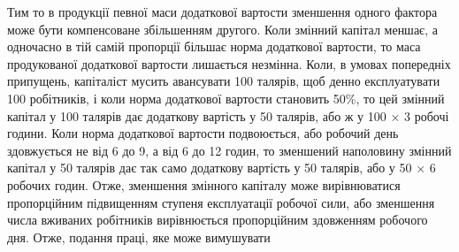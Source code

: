 Тим то в продукції певної маси додаткової вартости зменшення
одного фактора може бути компенсоване збільшенням другого.
Коли змінний капітал меншає, а одночасно в тій самій пропорції
більшає норма додаткової вартости, то маса продукованої додаткової
вартости лишається незмінна. Коли, в умовах попередніх
припущень, капіталіст мусить авансувати 100 талярів, щоб денно
експлуатувати 100 робітників, і коли норма додаткової вартости
становить 50\%, то цей змінний капітал у 100 талярів дає додаткову
вартість у 50 талярів, або ж у 100 × 3 робочі години. Коли
норма додаткової вартости подвоюється, або робочий день здовжується
не від 6 до 9, а від 6 до 12 годин, то зменшений наполовину
змінний капітал у 50 талярів дає так само додаткову
вартість у 50 талярів, або у 50 × 6 робочих годин. Отже,
зменшення змінного капіталу може вирівнюватися пропорційним
підвищенням ступеня експлуатації робочої сили, або зменшення
числа вживаних робітників вирівнюється пропорційним здовженням
робочого дня. Отже, подання праці, яке може вимушувати
\parbreak{}  %
